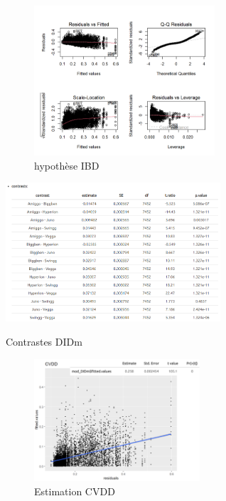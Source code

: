 \newpage

\label{an:DIDm}
\begin{figure}[ht]
\centering
\includegraphics[width=0.6\textwidth]{Image/hypothese DIDm.png}
\caption{hypothèse IBD}
\end{figure}
\begin{table}[ht]
\centering
\includegraphics[width=0.6\textwidth]{Image/contrast DIDm.png}
\caption{Contrastes DIDm}
\end{table}

\newpage

\label{an:CVDD}
\begin{figure}[ht]
\centering
\includegraphics[width=0.55\textwidth]{Image/CVDD.png}
\caption{Estimation CVDD}
\end{figure}

\newpage

